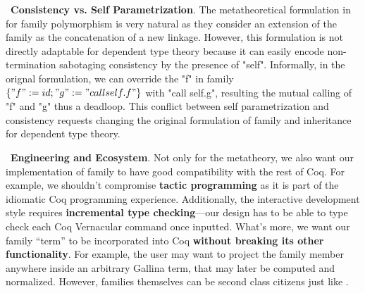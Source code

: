 ~\textbf{Consistency vs. Self Parametrization}.
The meta\-theoretical formulation in~\citet{zm2017} for family
polymorphism is very natural as they consider an extension of the family
as the concatenation of a new linkage. However, this formulation is not
directly adaptable for dependent type theory because it can easily
encode non-termination sabotaging consistency by the presence of "self".
Informally, in the orignal formulation, we can override the "f" in
family $\{"f" := id; "g" := "call self.f"\}$ with "call self.g",
resulting the mutual calling of "f" and "g" thus a deadloop. This
conflict between self parametrization and consistency requests changing
the original formulation of family and inheritance for dependent type
theory.


~\textbf{Engineering and Ecosystem}.
Not only for the metatheory, we also want our implementation of family
to have good compatibility with the rest of Coq. For example, we
shouldn't compromise \textbf{tactic programming} as it is part of the
idiomatic Coq programming experience. Additionally, the interactive development
style requires \textbf{incremental type checking}---our design has to be
able to type check each Coq Vernacular command once inputted. What's
more, we want our family ``term'' to be incorporated into Coq \textbf{without
breaking its other functionality}. For example, the user may want to
project the family member anywhere inside an arbitrary Gallina term,
that may later be computed and normalized. However, families themselves
can be second class citizens just like \citet{zm2017}.



